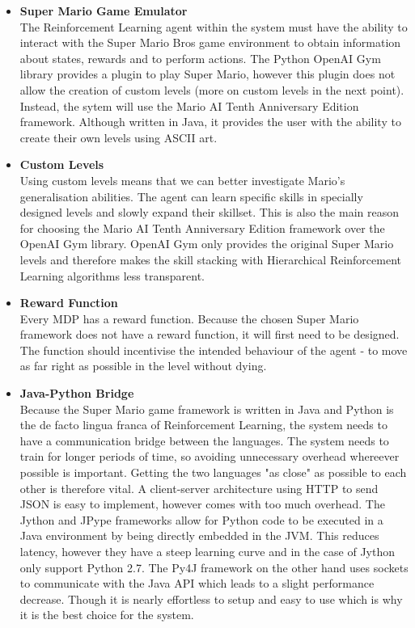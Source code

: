 \documentclass[notitlepage,a4paper,11pt]{article}
\begin{document}
\begin{itemize}

	\item \textbf{Super Mario Game Emulator}\\ 
	The Reinforcement Learning agent within the system must have the ability to interact with the Super Mario Bros game environment to obtain information about states, rewards and to perform actions. The Python OpenAI Gym library provides a plugin to play Super Mario, however this plugin does not allow the creation of custom levels (more on custom levels in the next point). Instead, the sytem will use the Mario AI Tenth Anniversary Edition \cite{marioai} framework. Although written in Java, it provides the user with the ability to create their own levels using ASCII art.
	
	\item \textbf{Custom Levels}\\
	Using custom levels means that we can better investigate Mario's generalisation abilities. The agent can learn specific skills in specially designed levels and slowly expand their skillset. This is also the main reason for choosing the Mario AI Tenth Anniversary Edition framework over the OpenAI Gym library. OpenAI Gym only provides the original Super Mario levels and therefore makes the skill stacking with Hierarchical Reinforcement Learning algorithms less transparent.
	
	\item \textbf{Reward Function}\\
Every MDP has a reward function. Because the chosen Super Mario framework does not have a reward function, it will first need to be designed. The function should incentivise the intended behaviour of the agent - to move as far right as possible in the level without dying.
	
	\item \textbf{Java-Python Bridge}\\
	Because the Super Mario game framework is written in Java and Python is the de facto lingua franca of Reinforcement Learning, the system needs to have a communication bridge between the languages. The system needs to train for longer periods of time, so avoiding unnecessary overhead whereever possible is important. Getting the two languages "as close" as possible to each other is therefore vital. A client-server architecture using HTTP to send JSON is easy to implement, however comes with too much overhead. The Jython \cite{jython} and JPype \cite{jpype} frameworks allow for Python code to be executed in a Java environment by being directly embedded in the JVM. This reduces latency, however they have a steep learning curve and in the case of Jython only support Python 2.7. The Py4J \cite{py4j} framework on the other hand uses sockets to communicate with the Java API which leads to a slight performance decrease. Though it is nearly effortless to setup and easy to use which is why it is the best choice for the system.
	

\end{itemize}
\end{document}
